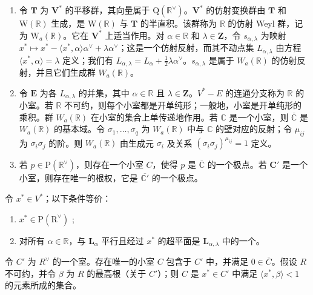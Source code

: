 \begin{enumerate}
\def\labelenumi{\arabic{enumi})}
\setcounter{enumi}{28}
\item
  令 \(\mathbf{T}\) 为 \(\mathbf{V}^*\) 的平移群，其向量属于 \(\mathrm{Q}(\mathbb{R}^{\vee})\)。\(\mathbf{V}^*\) 的仿射变换群由 \(\mathbf{T}\) 和 \(\mathrm{W}(\mathbb{R})\) 生成，是 \(\mathrm{W}(\mathbb{R})\) 与 \(\mathbf{T}\) 的半直积。该群称为 \(\mathbb{R}\) 的仿射 Weyl 群，记为 \(\mathrm{W}_a(\mathbb{R})\)。它在 \(\mathbf{V}^*\) 上适当作用。对 \(\alpha \in \mathbb{R}\) 和 \(\lambda \in \mathbf{Z}\)，令 \(s_{\alpha, \lambda}\) 为映射 \(x^* \mapsto x^* - \langle x^*, \alpha \rangle \alpha^{\vee} + \lambda \alpha^{\vee}\)；这是一个仿射反射，而其不动点集 \(L_{\alpha, \lambda}\) 由方程 \(\langle x^*, \alpha \rangle = \lambda\) 定义；我们有 \(L_{\alpha, \lambda} = L_{\alpha} + \frac{1}{2}\lambda \alpha^{\vee}\)。\(s_{\alpha, \lambda}\) 是属于 \(W_a(\mathbb{R})\) 的仿射反射，并且它们生成群 \(W_a(\mathbb{R})\)。
\item
  令 \(\mathbf{E}\) 为各 \(L_{\alpha, \lambda}\) 的并集，其中 \(\alpha \in \mathbb{R}\) 且 \(\lambda \in \mathbf{Z}\)。\(V^{*} - E\) 的连通分支称为 \(\mathbb{R}\) 的小室。若 \(\mathbb{R}\) 不可约，则每个小室都是开单纯形；一般地，小室是开单纯形的乘积。群 \(W_{a}(\mathbb{R})\) 在小室的集合上单传递地作用。若 \(\mathbb{C}\) 是一个小室，则 \(\overline{\mathbb{C}}\) 是 \(W_{a}(\mathbb{R})\) 的基本域。令 \(\sigma_{1}, \ldots, \sigma_{q}\) 为 \(W_{a}(\mathbb{R})\) 中与 \(\mathbb{C}\) 的壁对应的反射；令 \(\mu_{ij}\) 为 \(\sigma_{i}\sigma_{j}\) 的阶。则 \(W_{a}(\mathbb{R})\) 由生成元 \(\sigma_{i}\) 及关系 \((\sigma_{i}\sigma_{j})^{\mu_{ij}} = 1\) 定义。
\item
  若 \(p \in \mathrm{P}(\mathbb{R}^{\vee})\)，则存在一个小室 \(C\)，使得 \(p\) 是 \(\overline{\mathbb{C}}\) 的一个极点。若 \(\mathbf{C}'\) 是一个小室，则存在唯一的根权，它是 \(\overline{\mathbb{C}'}\) 的一个极点。
\end{enumerate}

令 \(x^{*} \in V^{*}\)；以下条件等价：

\begin{enumerate}
\def\labelenumi{\alph{enumi})}
\item
  \(x^{*} \in \mathrm{P}(\mathrm{R}^{\vee})\) ;
\item
  对所有 \(\alpha \in \mathbb{R}\)，与 \(\mathbf{L}_{\alpha}\) 平行且经过 \(x^{*}\) 的超平面是 \(\mathbf{L}_{\alpha,\lambda}\) 中的一个。
\end{enumerate}

令 \(C'\) 为 \(R^{\vee}\) 的一个室。存在唯一的小室 \(C\) 包含于 \(C'\) 中，并满足 \(0 \in \overline{C}\)。假设 \(R\) 不可约，并令 \(\beta\) 为 \(R\) 的最高根（关于 \(C'\)）；则 \(C\) 是 \(x^{*} \in C'\) 中满足 \(\langle x^{*}, \beta \rangle < 1\) 的元素所成的集合。

